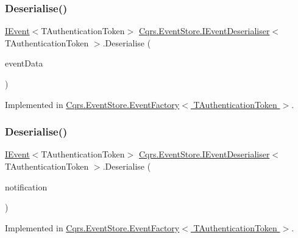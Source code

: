 \subsubsection{\texorpdfstring{Deserialise()}{Deserialise()}\hspace{0.1cm}{\footnotesize\ttfamily [1/2]}}
{\footnotesize\ttfamily \hyperlink{interfaceCqrs_1_1Events_1_1IEvent}{I\+Event}$<$T\+Authentication\+Token$>$ \hyperlink{interfaceCqrs_1_1EventStore_1_1IEventDeserialiser}{Cqrs.\+Event\+Store.\+I\+Event\+Deserialiser}$<$ T\+Authentication\+Token $>$.Deserialise (\begin{DoxyParamCaption}\item[{Recorded\+Event}]{event\+Data }\end{DoxyParamCaption})}



Implemented in \hyperlink{classCqrs_1_1EventStore_1_1EventFactory_abfd04f6833e4f010234d84a591f6eb6b}{Cqrs.\+Event\+Store.\+Event\+Factory$<$ T\+Authentication\+Token $>$}.

\mbox{\label{interfaceCqrs_1_1EventStore_1_1IEventDeserialiser_a931d4a498b2213aac492bd35518a3286}} 
\subsubsection{\texorpdfstring{Deserialise()}{Deserialise()}\hspace{0.1cm}{\footnotesize\ttfamily [2/2]}}
{\footnotesize\ttfamily \hyperlink{interfaceCqrs_1_1Events_1_1IEvent}{I\+Event}$<$T\+Authentication\+Token$>$ \hyperlink{interfaceCqrs_1_1EventStore_1_1IEventDeserialiser}{Cqrs.\+Event\+Store.\+I\+Event\+Deserialiser}$<$ T\+Authentication\+Token $>$.Deserialise (\begin{DoxyParamCaption}\item[{Resolved\+Event}]{notification }\end{DoxyParamCaption})}



Implemented in \hyperlink{classCqrs_1_1EventStore_1_1EventFactory_a1be7f3c4014991bc4b9619eaa2e8b9a4}{Cqrs.\+Event\+Store.\+Event\+Factory$<$ T\+Authentication\+Token $>$}.

